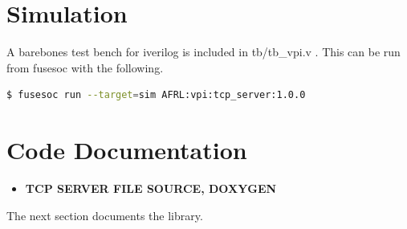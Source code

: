 \newpage

\section{Simulation}
\par
A barebones test bench for iverilog is included in tb/tb\_vpi.v . This can be run from fusesoc with the following.
\begin{lstlisting}[language=bash]
$ fusesoc run --target=sim AFRL:vpi:tcp_server:1.0.0
\end{lstlisting}

\newpage

\section{Code Documentation} \label{Code Documentation}

\begin{itemize}
\item \textbf{TCP SERVER FILE SOURCE, DOXYGEN}
\end{itemize}
The next section documents the library.

